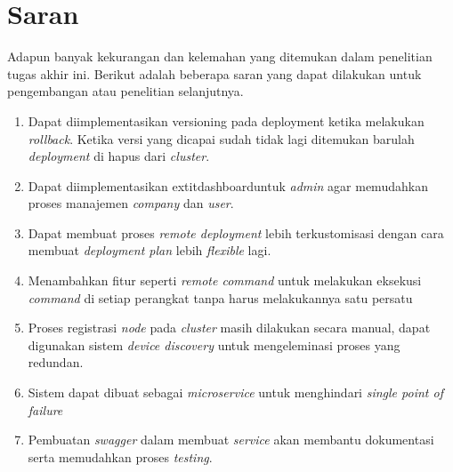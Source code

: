 \section{Saran}
Adapun banyak kekurangan dan kelemahan yang ditemukan dalam penelitian tugas akhir ini. Berikut adalah beberapa saran yang dapat dilakukan untuk pengembangan atau penelitian selanjutnya.
\begin{enumerate}
  \item Dapat diimplementasikan versioning pada deployment ketika melakukan \textit{rollback}. Ketika versi yang dicapai sudah tidak lagi ditemukan barulah \textit{deployment} di hapus dari \textit{cluster}.
  \item Dapat diimplementasikan	extit{dashboard}untuk \textit{admin} agar memudahkan proses manajemen \textit{company} dan \textit{user}.
  \item Dapat membuat proses \textit{remote deployment} lebih terkustomisasi dengan cara membuat \textit{deployment plan} lebih \textit{flexible} lagi.
  \item Menambahkan fitur seperti \textit{remote command} untuk melakukan eksekusi \textit{command} di setiap perangkat tanpa harus melakukannya satu persatu
  \item Proses registrasi \textit{node} pada \textit{cluster} masih dilakukan secara manual, dapat digunakan sistem \textit{device discovery} untuk mengeleminasi proses yang redundan.
  \item Sistem dapat dibuat sebagai \textit{microservice} untuk menghindari \textit{single point of failure}
  \item Pembuatan \textit{swagger} dalam membuat \textit{service} akan membantu dokumentasi serta memudahkan proses \textit{testing}.
\end{enumerate}
